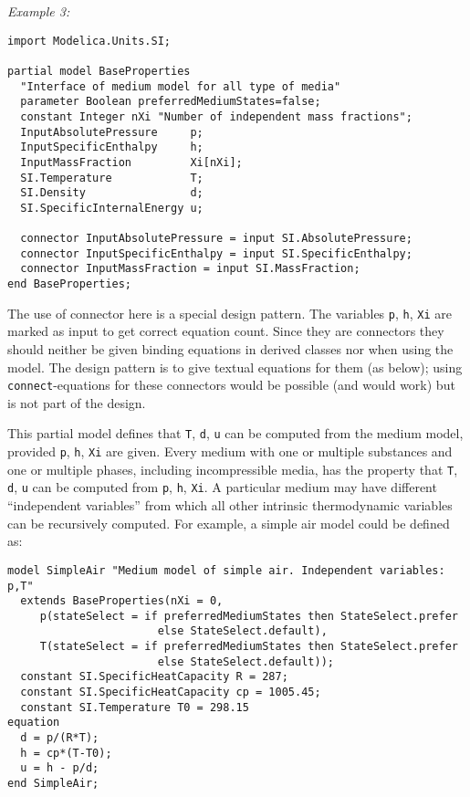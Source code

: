 \begin{example}
\emph{Example 3:}
\begin{lstlisting}[language=modelica]
import Modelica.Units.SI;

partial model BaseProperties
  "Interface of medium model for all type of media"
  parameter Boolean preferredMediumStates=false;
  constant Integer nXi "Number of independent mass fractions";
  InputAbsolutePressure     p;
  InputSpecificEnthalpy     h;
  InputMassFraction         Xi[nXi];
  SI.Temperature            T;
  SI.Density                d;
  SI.SpecificInternalEnergy u;

  connector InputAbsolutePressure = input SI.AbsolutePressure;
  connector InputSpecificEnthalpy = input SI.SpecificEnthalpy;
  connector InputMassFraction = input SI.MassFraction;
end BaseProperties;
\end{lstlisting}

The use of connector here is a special design pattern.
The variables \lstinline!p!, \lstinline!h!, \lstinline!Xi! are marked as input to get correct equation count.
Since they are connectors they should neither be given binding equations in derived classes nor when using the model.
The design pattern is to give textual equations for them (as below); using \lstinline!connect!-equations for these connectors would be possible (and would work) but is not part of the design.

This partial model defines that \lstinline!T!, \lstinline!d!, \lstinline!u! can be computed from
the medium model, provided \lstinline!p!, \lstinline!h!, \lstinline!Xi! are given.  Every medium with
one or multiple substances and one or multiple phases, including
incompressible media, has the property that \lstinline!T!, \lstinline!d!, \lstinline!u! can be computed
from \lstinline!p!, \lstinline!h!, \lstinline!Xi!. A particular medium may have different ``independent
variables'' from which all other intrinsic thermodynamic variables can
be recursively computed. For example, a simple air model could be
defined as:
\begin{lstlisting}[language=modelica]
model SimpleAir "Medium model of simple air. Independent variables: p,T"
  extends BaseProperties(nXi = 0,
     p(stateSelect = if preferredMediumStates then StateSelect.prefer
                       else StateSelect.default),
     T(stateSelect = if preferredMediumStates then StateSelect.prefer
                       else StateSelect.default));
  constant SI.SpecificHeatCapacity R = 287;
  constant SI.SpecificHeatCapacity cp = 1005.45;
  constant SI.Temperature T0 = 298.15
equation
  d = p/(R*T);
  h = cp*(T-T0);
  u = h - p/d;
end SimpleAir;
\end{lstlisting}


\end{example}
